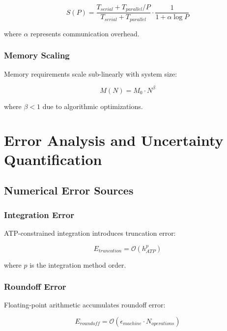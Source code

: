 \documentclass[12pt,a4paper]{article}
\begin{document}
\begin{equation}
S(P) = \frac{T_{serial} + T_{parallel}/P}{T_{serial} + T_{parallel}} \cdot \frac{1}{1 + \alpha \log P}
\end{equation}

where $\alpha$ represents communication overhead.

\subsubsection{Memory Scaling}

Memory requirements scale sub-linearly with system size:

\begin{equation}
M(N) = M_0 \cdot N^{\beta}
\end{equation}

where $\beta < 1$ due to algorithmic optimizations.

\section{Error Analysis and Uncertainty Quantification}

\subsection{Numerical Error Sources}

\subsubsection{Integration Error}

ATP-constrained integration introduces truncation error:

\begin{equation}
E_{truncation} = \mathcal{O}(h_{ATP}^p)
\end{equation}

where $p$ is the integration method order.

\subsubsection{Roundoff Error}

Floating-point arithmetic accumulates roundoff error:

\begin{equation}
E_{roundoff} = \mathcal{O}(\epsilon_{machine} \cdot N_{operations})
\end{equation}
\end{document}
